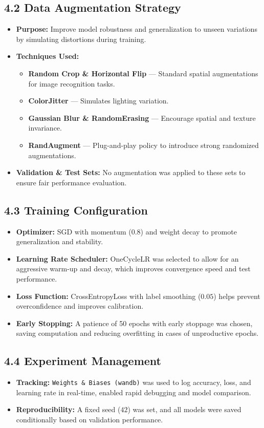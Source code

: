 \documentclass{article}
\begin{document}
\subsection*{4.2 Data Augmentation Strategy}
\begin{itemize}
    \item \textbf{Purpose:} Improve model robustness and generalization to unseen variations by simulating distortions during training.
    \item \textbf{Techniques Used:}
    \begin{itemize}
        \item \textbf{Random Crop \& Horizontal Flip} — Standard spatial augmentations for image recognition tasks.
        \item \textbf{ColorJitter} — Simulates lighting variation.
        \item \textbf{Gaussian Blur \& RandomErasing} — Encourage spatial and texture invariance.
        \item \textbf{RandAugment} — Plug-and-play policy to introduce strong randomized augmentations.
    \end{itemize}
    \item \textbf{Validation \& Test Sets:} No augmentation was applied to these sets to ensure fair performance evaluation.
\end{itemize}

\subsection*{4.3 Training Configuration}
\begin{itemize}
    \item \textbf{Optimizer:} SGD with momentum ($0.8$) and weight decay to promote generalization and stability.
    \item \textbf{Learning Rate Scheduler:} OneCycleLR was selected to allow for an aggressive warm-up and decay, which improves convergence speed and test performance.
    \item \textbf{Loss Function:} CrossEntropyLoss with label smoothing ($0.05$) helps prevent overconfidence and improves calibration.
    \item \textbf{Early Stopping:} A patience of 50 epochs with early stoppage was chosen, saving computation and reducing overfitting in cases of unproductive epochs.
\end{itemize}

\subsection*{4.4 Experiment Management}
\begin{itemize}
    \item \textbf{Tracking:} \texttt{Weights \& Biases (wandb)} was used to log accuracy, loss, and learning rate in real-time, enabled rapid debugging and model comparison.
    \item \textbf{Reproducibility:} A fixed seed ($42$) was set, and all models were saved conditionally based on validation performance.
\end{itemize}
\end{document}
